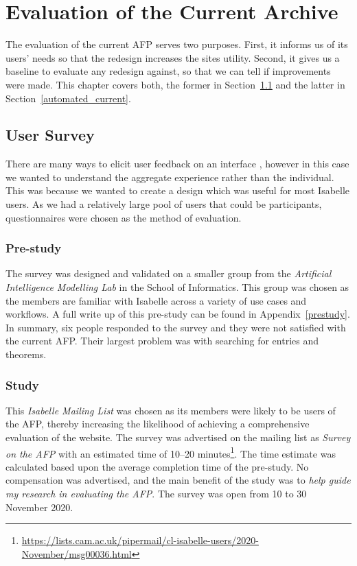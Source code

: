 \documentclass[bsc,frontabs,oneside,singlespacing,parskip,deptreport,logo]{infthesis}
\begin{document}

\chapter{Evaluation of the Current Archive} \label{evaluation-current}

\cbstart
The evaluation of the current AFP serves two purposes. First, it informs us of its users' needs so that the redesign increases the sites utility. Second, it gives us a baseline to evaluate any redesign against, so that we can tell if improvements were made. This chapter covers both, the former in Section~\ref{sec:user-survey} and the latter in Section~\ref{automated_current}.

\section{User Survey} \label{sec:user-survey}
 \cbstart
There are many ways to elicit user feedback on an interface \cite{hanington2012universal}, however in this case we wanted to understand the aggregate experience rather than the individual. This was because we wanted to create a design which was useful for most Isabelle users. As we had a relatively large pool of users that could be participants, questionnaires were chosen as the method of evaluation.
\cbend
\subsection{Pre-study} \label{sec:pre-study}

The survey was designed and validated on a smaller group from the \emph{Artificial Intelligence Modelling Lab} in the School of Informatics. This group was chosen as the members are familiar with Isabelle across a variety of use cases and workflows. A full write up of this pre-study can be found in Appendix~\ref{prestudy}. In summary, six people responded to the survey and they were not satisfied with the current AFP\@. Their largest problem was with searching for entries and theorems.

\subsection{Study}

\cbend This \textit{Isabelle Mailing List} was chosen as its members were likely to be users of the AFP, thereby increasing the likelihood of achieving a comprehensive evaluation of the website. The survey was advertised on the mailing list as \emph{Survey on the AFP} with an estimated time of 10--20 minutes\footnote{\url{https://lists.cam.ac.uk/pipermail/cl-isabelle-users/2020-November/msg00036.html}}. The time estimate was calculated based upon the average completion time of the pre-study. No compensation was advertised, and the main benefit of the study was to \emph{help guide my research in evaluating the AFP}. The survey was open from 10 to 30 November 2020.
\end{document}

